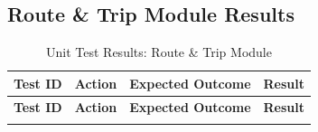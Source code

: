 \subsection{Route \& Trip Module Results}

\small
\begin{longtable}{|p{}|>{\raggedright\arraybackslash}p{}|>{\raggedright\arraybackslash}p{}|p{}|}
\hline
\textbf{Test ID} & \textbf{Action} & \textbf{Expected Outcome} & \textbf{Result} \\
\hline
\endfirsthead

\hline
\textbf{Test ID} & \textbf{Action} & \textbf{Expected Outcome} & \textbf{Result} \\
\hline
\endhead

\hline
\endfoot

\hline
\caption{Unit Test Results: Route \& Trip Module}
\endlastfoot


\end{longtable}
